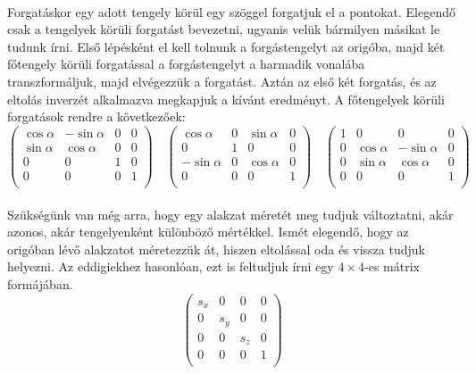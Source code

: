 \documentclass[12pt]{report}
\begin{document}
\paragraph{}
Forgatáskor egy adott tengely körül egy szöggel forgatjuk el a pontokat. Elegendő csak a tengelyek körüli forgatást bevezetni, ugyanis velük bármilyen másikat le tudunk írni. Első lépésként el kell tolnunk a forgástengelyt az origóba, majd két főtengely körüli forgatással a forgástengelyt a harmadik vonalába transzformáljuk, majd elvégezzük a forgatást. Aztán az első két forgatás, és az eltolás inverzét alkalmazva megkapjuk a kívánt eredményt. A főtengelyek körüli forgatások rendre a következőek:
$$
\left( \begin{array}{cccc}
	\cos\alpha & -\sin\alpha & 0 & 0 \\
	\sin\alpha & \cos\alpha & 0 & 0 \\
	0 & 0 & 1 & 0 \\
	0 & 0 & 0 & 1 \\
\end{array} \right)
\quad
\left( \begin{array}{cccc}
	\cos\alpha & 0 & \sin\alpha & 0 \\
	0 & 1 & 0 & 0 \\
	-\sin\alpha & 0 & \cos\alpha & 0 \\
	0 & 0 & 0 & 1 \\
\end{array} \right)
\quad
\left( \begin{array}{cccc}
	1 & 0 & 0 & 0 \\
	0 & \cos\alpha & -\sin\alpha & 0 \\
	0 & \sin\alpha & \cos\alpha & 0 \\
	0 & 0 & 0 & 1 \\
\end{array} \right)
$$
\paragraph{}
Szükségünk van még arra, hogy egy alakzat méretét meg tudjuk változtatni, akár azonos, akár tengelyenként különböző mértékkel. Ismét elegendő, hogy az origóban lévő alakzatot méretezzük át, hiszen eltolással oda és vissza tudjuk helyezni.  Az eddigiekhez hasonlóan, ezt is feltudjuk írni egy $4 \times 4$-es mátrix formájában.
$$
\left( \begin{array}{cccc}
	s_x & 0 & 0 & 0 \\
	0 & s_y & 0 & 0 \\
	0 & 0 & s_z & 0 \\
	0 & 0 & 0 & 1 \\
\end{array} \right)
$$
\end{document}
